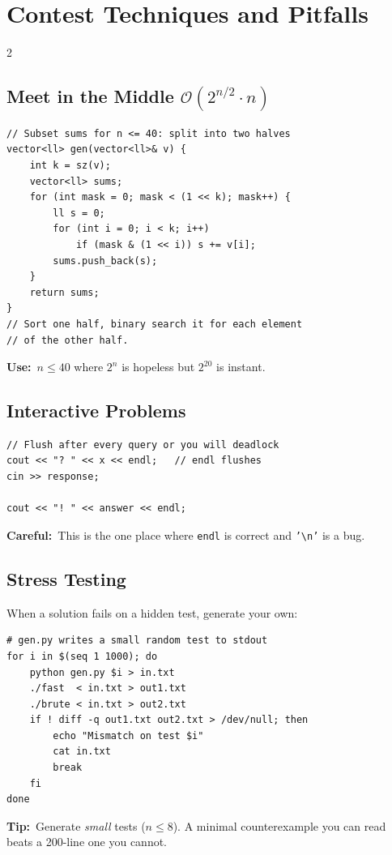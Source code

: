 \documentclass[10pt]{article}
\newcommand{\code}[1]{\texttt{\small #1}}
\newcommand{\sub}[2]{\subsection[#1]{#1\hspace{0.6em}%
  \textnormal{\color{accent2}\small$\mathcal{O}(#2)$}}}
\newcommand{\uses}[1]{{\color{accent2}\footnotesize\textbf{Use:}}~{\footnotesize #1}\par}
\newcommand{\tip}[1]{{\color{tipc}\footnotesize\textbf{Tip:}}~{\footnotesize #1}\par}
\newcommand{\warn}[1]{{\color{warnc}\footnotesize\textbf{Careful:}}~{\footnotesize #1}\par}
\begin{document}
\section{Contest Techniques and Pitfalls}
\begin{multicols}{2}

\sub{Meet in the Middle}{2^{n/2} \cdot n}
\begin{lstlisting}
// Subset sums for n <= 40: split into two halves
vector<ll> gen(vector<ll>& v) {
    int k = sz(v);
    vector<ll> sums;
    for (int mask = 0; mask < (1 << k); mask++) {
        ll s = 0;
        for (int i = 0; i < k; i++)
            if (mask & (1 << i)) s += v[i];
        sums.push_back(s);
    }
    return sums;
}
// Sort one half, binary search it for each element
// of the other half.
\end{lstlisting}
\uses{$n \le 40$ where $2^n$ is hopeless but $2^{20}$ is instant.}

\subsection{Interactive Problems}
\begin{lstlisting}
// Flush after every query or you will deadlock
cout << "? " << x << endl;   // endl flushes
cin >> response;

cout << "! " << answer << endl;
\end{lstlisting}
\warn{This is the one place where \code{endl} is correct and
\code{'\textbackslash n'} is a bug.}

\subsection{Stress Testing}
When a solution fails on a hidden test, generate your own:
\begin{lstlisting}
# gen.py writes a small random test to stdout
for i in $(seq 1 1000); do
    python gen.py $i > in.txt
    ./fast  < in.txt > out1.txt
    ./brute < in.txt > out2.txt
    if ! diff -q out1.txt out2.txt > /dev/null; then
        echo "Mismatch on test $i"
        cat in.txt
        break
    fi
done
\end{lstlisting}
\tip{Generate \emph{small} tests ($n \le 8$). A minimal counterexample
you can read beats a 200-line one you cannot.}


\end{multicols}
\end{document}
